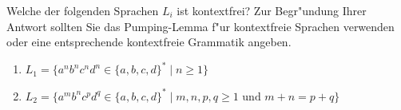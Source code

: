 \begin{exercise}
  Welche der folgenden Sprachen $L_i$ ist kontextfrei? Zur Begr"undung
  Ihrer Antwort sollten Sie das Pumping-Lemma f"ur kontextfreie
  Sprachen verwenden oder eine entsprechende kontextfreie Grammatik
  angeben.
  \begin{enumerate}
  \item $L_1 =\{ a^n b^n c^n d^n \in \{a,b,c,d\}^* \mid n\ge 1 \}$
  \item $L_2 =\{ a^mb^n c^pd^q \in \{a,b,c,d\}^* \mid m,n,p,q \ge 1
    \text{ und } m+n = p + q \}$
  \end{enumerate}
\end{exercise}

